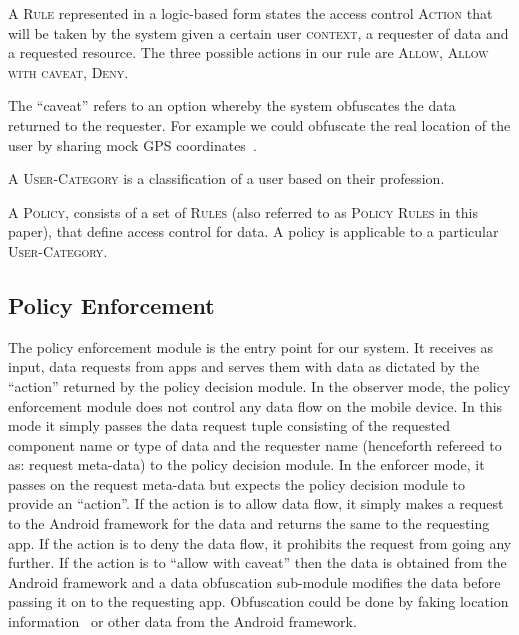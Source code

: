\begin{definition}
A \textsc{Rule} represented in a logic-based form states the access control \textsc{Action} that will be taken by the system given a certain user \textsc{context}, a requester of data and a requested resource. The three possible actions in our rule are \textsc{Allow, Allow with caveat, Deny}. 
\end{definition}
The ``caveat'' refers to an option whereby the system obfuscates the data returned to the requester. For example we could obfuscate the real location of the user by sharing mock GPS coordinates~\cite{Beresford2011MockDroid}.

\begin{definition}
A \textsc{User-Category} is a classification of a user based on their profession.
\end{definition}

\begin{definition}
A \textsc{Policy}, consists of a set of \textsc{Rules} (also referred to as \textsc{Policy Rules} in this paper), that define access control for data. A policy is applicable to a particular \textsc{User-Category}.
\end{definition}

\subsection{Policy Enforcement}
\label{polenf}
The policy enforcement module is the entry point for our system. It receives as input, data requests from apps and serves them with data as dictated by the ``action'' returned by the policy decision module. In the observer mode, the policy enforcement module does not control any data flow on the mobile device. In this mode it simply passes the data request tuple consisting of the requested component name or type of data and the requester name (henceforth refereed to as: request meta-data) to the policy decision module. In the enforcer mode, it passes on the request meta-data but expects the policy decision module to provide an ``action''. If the action is to allow data flow, it simply makes a request to the Android framework for the data and returns the same to the requesting app. If the action is to deny the data flow, it prohibits the request from going any further. If the action is to ``allow with caveat'' then the data is obtained from the Android framework and a data obfuscation sub-module modifies the data before passing it on to the requesting app. Obfuscation could be done by faking location information~\cite{Beresford2011MockDroid} or other data from the Android framework.

